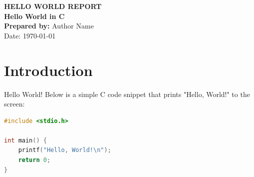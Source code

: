 \documentclass[12pt,a4paper]{report}
\begin{document}
\begin{titlepage}
    \centering
    {\Large\textbf{HELLO WORLD REPORT}}\\[2cm]
    {\Huge\textbf{Hello World in C}}\\[3cm]
    \textbf{Prepared by:} Author Name\\[0.5cm]
    {\large Date: \today}
\end{titlepage}

\tableofcontents
\newpage

\chapter{Introduction}
Hello World! Below is a simple C code snippet that prints "Hello, World!" to the screen:
\begin{lstlisting}[language=C]
#include <stdio.h>

int main() {
    printf("Hello, World!\n");
    return 0;
}
\end{lstlisting}
\end{document}
